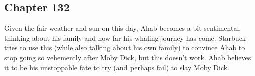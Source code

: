 \subsection{Chapter 132}

Given the fair weather and sun on this day, Ahab becomes a bit sentimental,
thinking about his family and how far his whaling journey has come. Starbuck
tries to use this (while also talking about his own family) to convince Ahab
to stop going so vehemently after Moby Dick, but this doesn't work. Ahab
believes it to be his unstoppable fate to try (and perhaps fail) to slay Moby
Dick.
